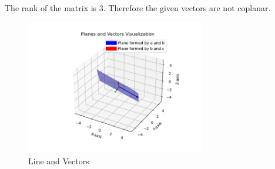 \documentclass[journal]{IEEEtran}
\begin{document}
The rank of the matrix is 3. Therefore the given vectors are not coplanar.
\newpage
\begin{figure}[h!]
\begin{center}
	\includegraphics[width=0.7\textwidth]{Fig/fig.png}
	\caption{Line and Vectors}
	\label{fig:4-4.2-13 - Figure -1}
\end{center}
\end{figure}
\end{document}
